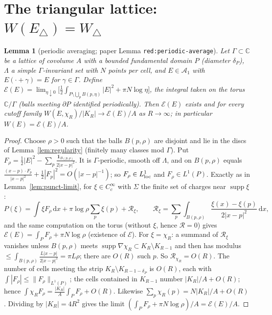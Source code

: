 \documentclass[11pt]{article}
\newtheorem{lemma}[theorem]{Lemma}
\theoremstyle{definition}
\theoremstyle{remark}
\newcommand{\C}{\mathbb C}
\newcommand{\dd}{\,\mathrm d}
\newcommand{\Lam}{\Lambda}
\DeclareMathOperator{\supp}{supp}
\begin{document}
\section{The triangular lattice: $W(E_\triangle)=W_\triangle$}

\begin{lemma}[periodic averaging; paper Lemma \texttt{red:periodic-average}]\label{lem:periodic}
Let $\Gamma\subset\C$ be a lattice of covolume $A$ with a bounded fundamental domain $P$ (diameter $\delta_P$), $\Lam$ a simple $\Gamma$-invariant set with $N$ points per cell, and $E\in\mathcal A_1$ with $E(\cdot+\gamma)=E$ for $\gamma\in\Gamma$.  Define
$\mathcal E(E)=\lim_{\eta\downarrow0}\bigl[\frac12\int_{P\setminus\bigcup_{p}B(p,\eta)}|E|^2+\pi N\log\eta\bigr]$, the integral taken on the torus $\C/\Gamma$ (balls meeting $\partial P$ identified periodically).  Then $\mathcal E(E)$ exists and for every cutoff family $W(E,\chi_R)/|K_R|\to\mathcal E(E)/A$ as $R\to\infty$; in particular $W(E)=\mathcal E(E)/A$.
\end{lemma}
\begin{proof}
Choose $\rho>0$ such that the balls $B(p,\rho)$ are disjoint and lie in the discs of Lemma~\ref{lem:regularity} (finitely many classes mod $\Gamma$).  Put $F_\rho=\frac12|E|^2-\sum_p\frac{\mathbf 1_{B(p,\rho)}}{2|x-p|^2}$.  It is $\Gamma$-periodic, smooth off $\Lam$, and on $B(p,\rho)$ equals $\frac{(x-p)\cdot F_p}{|x-p|^2}+\frac12|F_p|^2=O(|x-p|^{-1})$; so $F_\rho\in L^1_{\rm loc}$ and $F_\rho\in L^1(P)$.  Exactly as in Lemma~\ref{lem:punct-limit}, for $\xi\in C_c^\infty$ with $\Sigma$ the finite set of charges near $\supp\xi$:
\[
P(\xi)=\int\xi F_\rho\dd x+\pi\log\rho\sum_p\xi(p)+\mathcal R_\xi,\qquad\mathcal R_\xi=\sum_p\int_{B(p,\rho)}\frac{\xi(x)-\xi(p)}{2|x-p|^2}\dd x ,
\]
and the same computation on the torus (without $\xi$, hence $\mathcal R=0$) gives $\mathcal E(E)=\int_PF_\rho+\pi N\log\rho$ (existence of $\mathcal E$).
For $\xi=\chi_R$: a summand of $\mathcal R_\xi$ vanishes unless $B(p,\rho)$ meets $\supp\nabla\chi_R\subset K_R\setminus K_{R-1}$ and then has modulus $\le\int_{B(p,\rho)}\frac{L|x-p|}{2|x-p|^2}=\pi L\rho$; there are $O(R)$ such $p$.  So $\mathcal R_{\chi_R}=O(R)$.  The number of cells meeting the strip $K_{R}\setminus K_{R-1-\delta_P}$ is $O(R)$, each with $\int|F_\rho|\le\|F_\rho\|_{L^1(P)}$; the cells contained in $K_{R-1}$ number $|K_R|/A+O(R)$; hence $\int\chi_RF_\rho=\frac{|K_R|}A\int_PF_\rho+O(R)$.  Likewise $\sum_p\chi_R(p)=N|K_R|/A+O(R)$.  Dividing by $|K_R|=4R^2$ gives the limit $(\int_PF_\rho+\pi N\log\rho)/A=\mathcal E(E)/A$.
\end{proof}
\end{document}
